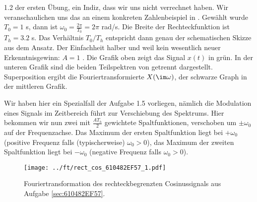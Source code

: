 \begin{ExCalc}
1.2 der ersten Übung,
ein Indiz, dass wir uns nicht verrechnet haben.
%
Wir veranschaulichen uns das an einem konkreten Zahlenbeispiel in
. Gewählt wurde $T_0=1$ s, dann ist
$\omega_0 = \frac{2\pi}{T_0}=2\pi$ rad/s. Die Breite der Rechteckfunktion
ist $T_h=3.2$ s. Das Verhältnis $T_0/T_h$ entspricht dann genau der
schematischen Skizze aus dem Ansatz. Der Einfachheit halber und weil
kein wesentlich neuer Erkenntnisgewinn: $A=1$ .
%
Die Grafik oben zeigt das Signal $x(t)$ in grün.
In der unteren Grafik sind die beiden Teilspektren von 
getrennt dargestellt.
Superposition ergibt die Fouriertransformierte $X(\im\omega)$, der schwarze
Graph in der mittleren Grafik.

Wir haben hier ein Spezialfall der Aufgabe 1.5 vorliegen, nämlich die Modulation
eines Signals im Zeitbereich führt zur Verschiebung des Spektrums.
Hier bekommen wir nun zwei mit $\frac{A T_h}{2}$ gewichtete Spaltfunktionen,
verschoben um $\pm \omega_0$ auf der Frequenzachse. Das Maximum der ersten Spaltfunktion
liegt bei $+\omega_0$ (positive Frequenz falls (typischerweise) $\omega_0>0$),
das Maximum der zweiten Spaltfunktion liegt bei $-\omega_0$ (negative Frequenz
falls $\omega_0>0$).


\end{ExCalc}
%
\begin{figure}[h]
\centering
  \texttt{[image: ../ft/rect\_cos\_610482EF57\_1.pdf]}
  \caption{Fouriertransformation des rechteckbegrenzten Cosinussignals
  aus Aufgabe \ref{sec:610482EF57}.}
  \label{fig:rect_cos_610482EF57_1}
\end{figure}









